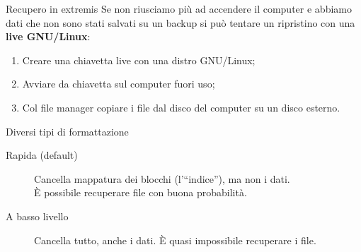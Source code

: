 \begin{myframe}{Recupero in extremis}
  Se non riusciamo più ad accendere il computer e abbiamo dati che non sono stati salvati su un backup si può tentare un ripristino con una \textbf{live GNU/Linux}:
  \pause
  \begin{enumerate}[<+->]
    \item Creare una chiavetta live con una distro GNU/Linux;
    \item Avviare da chiavetta sul computer fuori uso;
    \item Col file manager copiare i file dal disco del computer su un disco esterno.
  \end{enumerate}

  \bigskip
\end{myframe}

\begin{myframe}{Diversi tipi di formattazione}
  \begin{description}
    \item[Rapida (default)] Cancella mappatura dei blocchi (l'``indice''), ma non i dati.\\È possibile recuperare file con buona probabilità.
    \item[A basso livello] Cancella tutto, anche i dati. È quasi impossibile recuperare i file.
  \end{description}
\end{myframe}



